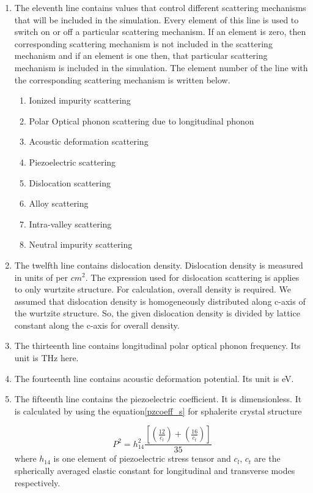 \documentclass[12pt]{article}
\begin{document}
\begin{enumerate}
\begin{enumerate}[label=\Roman*]
\item The eleventh line contains values that control different scattering mechanisms that will be included in the simulation. Every element of this line is used to switch on or off a particular scattering mechanism. If an element is zero, then corresponding scattering mechanism is not included in the scattering mechanism and if an element is one then, that particular scattering mechanism is included in the simulation. The element number of the line with the corresponding scattering mechanism is written below. 
	\begin{enumerate}
	\item Ionized impurity scattering 
	\item Polar Optical phonon scattering due to longitudinal phonon
	\item Acoustic deformation scattering
	\item Piezoelectric scattering
	\item Dislocation scattering
	\item Alloy scattering
	\item Intra-valley scattering
	\item Neutral impurity scattering
	\end{enumerate}
\item The twelfth line contains dislocation density. Dislocation density is measured in units of per $cm^2$. The expression used for dislocation scattering is applies to only wurtzite structure. For calculation, overall density is required. We assumed that dislocation density is homogeneously distributed along c-axis of the wurtzite structure. So, the given dislocation density is divided by lattice constant along the c-axis for overall density.

\item The thirteenth line contains longitudinal polar optical phonon frequency. Its unit is THz here.
\item The fourteenth line contains acoustic deformation potential. Its unit is eV. 
\item The fifteenth line contains the piezoelectric coefficient. It is dimensionless. It is calculated by using the equation\ref{pzcoeff_s} for sphalerite crystal structure \cite{rode1}

\begin{equation}
\ P^2 = h_{14}^2\frac{[(\frac{12}{c_l})+(\frac{16}{c_t})]}{35} 
\label{pzcoeff_s}
\end{equation}
where $h_{14}$ is one element of piezoelectric stress tensor and  $c_l$, $c_t$ are the spherically averaged elastic constant for longitudinal and transverse modes respectively.


\end{enumerate}
\end{enumerate}
\end{document}
